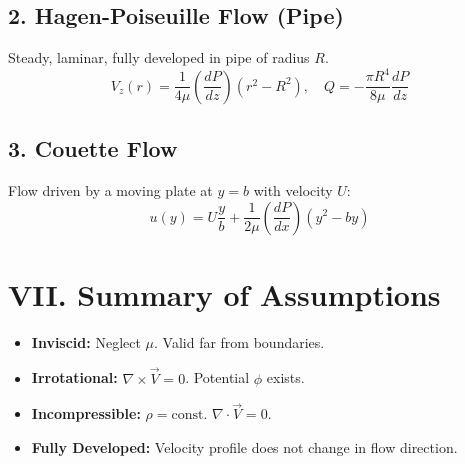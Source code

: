 \documentclass[9pt, a4paper, twocolumn]{article}
\begin{document}
\subsection{2. Hagen-Poiseuille Flow (Pipe)}
Steady, laminar, fully developed in pipe of radius $R$.
\begin{equation*}
    V_z(r) = \frac{1}{4\mu} \left( \frac{dP}{dz} \right) (r^2 - R^2), \quad Q = -\frac{\pi R^4}{8\mu} \frac{dP}{dz}
\end{equation*}

\subsection{3. Couette Flow}
Flow driven by a moving plate at $y=b$ with velocity $U$:
\begin{equation*}
    u(y) = U\frac{y}{b} + \frac{1}{2\mu}\left(\frac{dP}{dx}\right)(y^2 - by)
\end{equation*}

\section{VII. Summary of Assumptions}
\begin{itemize}
    \item \textbf{Inviscid:} Neglect $\mu$. Valid far from boundaries.
    \item \textbf{Irrotational:} $\nabla \times \vec{V} = 0$. Potential $\phi$ exists.
    \item \textbf{Incompressible:} $\rho = \text{const}$. $\nabla \cdot \vec{V} = 0$.
    \item \textbf{Fully Developed:} Velocity profile does not change in flow direction.
\end{itemize}
\end{document}
